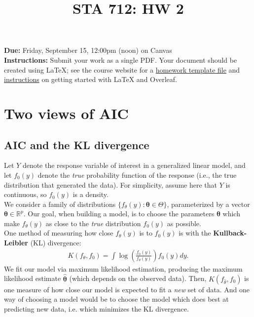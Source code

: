 \documentclass[11pt]{article}
\title{STA 712: HW 2}
\author{}
\date{}
\begin{document}
\maketitle

\noindent \textbf{Due:} Friday, September 15, 12:00pm (noon) on Canvas\\

\noindent \textbf{Instructions:} Submit your work as a single PDF. Your document should be created using LaTeX; see the course website for a \href{https://sta712-f23.github.io/homework/hw_template.tex}{homework template file} and \href{https://sta712-f23.github.io/homework/latex_instructions/}{instructions} on getting started with LaTeX and Overleaf.

\section{Two views of AIC}

\subsection*{AIC and the KL divergence}

Let $Y$ denote the response variable of interest in a generalized linear model, and let $f_0(y)$ denote the \textit{true} probability function of the response (i.e., the true distribution that generated the data). For simplicity, assume here that $Y$ is continuous, so $f_0(y)$ is a density.\\

\noindent We consider a family of distributions $\{f_{\theta}(y) : \bm{\theta} \in \Theta \}$, parameterized by a vector $\bm{\theta} \in \mathbb{R}^p$. Our goal, when building a model, is to choose the parameters $\bm{\theta}$ which make $f_\theta(y)$ as close to the \textit{true} distribution $f_0(y)$ as possible.\\

\noindent One method of measuring how close $f_\theta(y)$ is to $f_0(y)$ is with the \textbf{Kullback-Leibler} (KL) divergence:
\begin{align}
K(f_\theta, f_0) = \int \log \left( \frac{f_0(y)}{f_\theta(y)} \right) f_0(y) dy.
\end{align}
We fit our model via maximum likelihood estimation, producing the maximum likelihood estimate $\widehat{\bm{\theta}}$ (which depends on the observed data). Then, $K(f_{\widehat{\theta}}, f_0)$ is one measure of how close our model is expected to fit a \textit{new} set of data. And one way of choosing a model would be to choose the model which does best at predicting new data, i.e. which minimizes the KL divergence.\\
\end{document}
